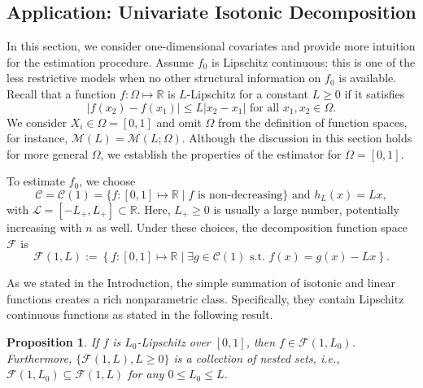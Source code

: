 \documentclass[12pt]{article}
\newtheorem{proposition}[theorem]{Proposition}
\begin{document}
\subsection{Application: Univariate Isotonic Decomposition}\label{sec:estimator}

In this section, we consider one-dimensional covariates and provide more intuition for the estimation procedure. Assume $f_0$ is Lipschitz continuous: this is one of the less restrictive models when no other structural information on $f_0$ is available. Recall that a function $f: \Omega \mapsto \mathbb{R}$ is $L$-Lipschitz for a constant $L \ge 0$ if it satisfies
\begin{equation}\label{eq:def-lipschitz}
\left|f(x_2)-f(x_1)\right| \leq L\left|x_2-x_1\right| \text { for all } x_1, x_2 \in\Omega.
\end{equation}
We consider $X_i\in\Omega = [0,1]$ and omit $\Omega$ from the definition of function spaces, for instance, $\mathcal{M}(L) = \mathcal{M}(L; \Omega).$ Although the discussion in this section holds for more general $\Omega$, we establish the properties of the estimator for $\Omega = [0,1]$.

To estimate $f_0$, we choose 
\begin{equation}\label{eq:choice-C-hL}
    \mathcal{C} = \mathcal{C}(1) = \{f:[0,1]\mapsto \mathbb{R}\mid f\mbox{ is non-decreasing}\} \mbox{ and } h_L(x) = Lx,
\end{equation} with $\mathcal{L} = [-L_+,L_+] \subset\mathbb{R}$. Here, $L_+ \geq 0$ is usually a large number, potentially increasing with $n$ as well. Under these choices, the decomposition function space $\mathcal{F}$ is 
\begin{equation}\label{eq:1-decomp-function-space}
\mathcal{F}(1, L) := \left\{f:[0,1]\mapsto\mathbb{R}\mid \exists g\in\mathcal{C}(1)\text{ s.t. }f(x) = g(x) - Lx\right\}.
\end{equation}

As we stated in the Introduction, the simple summation of isotonic and linear functions creates a rich nonparametric class. Specifically, they contain Lipschitz continuous functions as stated in the following result.

\begin{proposition}\label{prop:simplied}
If $f$ is $L_0$-Lipschitz over $[0,1]$, then $f\in\mathcal{F}(1, L_0)$. Furthermore, $\{\mathcal{F}(1, L), L \geq 0\}$ is a collection of nested sets, i.e., $\mathcal{F}(1, L_0) \subseteq \mathcal{F}(1, L)$ for any $0 \le L_0 \le L$.
\end{proposition}
\end{document}
